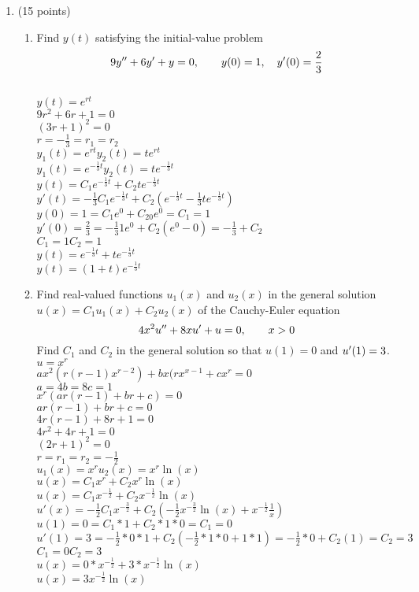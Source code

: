 \documentclass{article}
\begin{document}
\begin{enumerate}
\bigskip
\item (15 points)
\begin{enumerate}
\item
Find $y(t)$ satisfying the initial-value problem
\[
9y\sp{\prime\prime}+6y\sp\prime+y=0,\qquad y(0)=1,\quad y\sp\prime(0)={2\over3}
\]
\\$y(t)=e^{rt}$
\\$9r^2+6r+1=0$
\\$(3r+1)^2=0$
\\$r=-\frac{1}{3}=r_1=r_2$
\\$y_1(t)=e^{rt}$\qquad$y_2(t)=te^{rt}$
\\$y_1(t)=e^{-\frac{1}{3}t}$\qquad$y_2(t)=te^{-\frac{1}{3}t}$
\\$y(t)=C_1e^{-\frac{1}{3}t}+C_2te^{-\frac{1}{3}t}$
\\$y'(t)=-\frac{1}{3}C_1e^{-\frac{1}{3}t}+C_2(e^{-\frac{1}{3}t}-\frac{1}{3}te^{-\frac{1}{3}t})$
\\$y(0)=1=C_1e^0+C_20e^0=C_1=1$
\\$y'(0)=\frac{2}{3}=-\frac{1}{3}1e^0+C_2(e^0-0)=-\frac{1}{3}+C_2$
\\$C_1=1$\qquad$C_2=1$
\\$y(t)=e^{-\frac{1}{3}t}+te^{-\frac{1}{3}t}$
\\$y(t)=(1+t)e^{-\frac{1}{3}t}$
\item
Find real-valued functions $u_1(x)$ and $u_2(x)$ in the general solution $u(x)=C_1u_1(x)+C_2u_2(x)$ of the Cauchy-Euler equation
\[
4x\sp2u\sp{\prime\prime}+8xu\sp\prime+u=0,\qquad x>0
\]
Find $C_1$ and $C_2$ in the general solution so that $u(1)=0$ and $u\sp\prime(1)=3$.
\\$u=x^r$
\\$ax^2(r(r-1)x^{r-2})+bx(rx^{x-1}+cx^r=0$
\\$a=4$\qquad$b=8$\qquad$c=1$
\\$x^r(ar(r-1)+br+c)=0$
\\$ar(r-1)+br+c=0$
\\$4r(r-1)+8r+1=0$
\\$4r^2+4r+1=0$
\\$(2r+1)^2=0$
\\$r=r_1=r_2=-\frac{1}{2}$
\\$u_1(x)=x^r$\qquad$u_2(x)=x^r\ln(x)$
\\$u(x)=C_1x^r+C_2x^r\ln(x)$
\\$u(x)=C_1x^{-\frac{1}{2}}+C_2x^{-\frac{1}{2}}\ln(x)$
\\$u'(x)=-\frac{1}{2}C_1x^{-\frac{3}{2}}+C_2(-\frac{1}{2}x^{-\frac{3}{2}}\ln(x)+x^{-\frac{1}{2}}\frac{1}{x})$
\\$u(1)=0=C_1*1+C_2*1*0=C_1=0$
\\$u'(1)=3=-\frac{1}{2}*0*1+C_2(-\frac{1}{2}*1*0+1*1)=-\frac{1}{2}*0+C_2(1)=C_2=3$
\\$C_1=0$\qquad$C_2=3$
\\$u(x)=0*x^{-\frac{1}{2}}+3*x^{-\frac{1}{2}}\ln(x)$
\\$u(x)=3x^{-\frac{1}{2}}\ln(x)$





\end{enumerate}

\end{enumerate}
\end{document}
